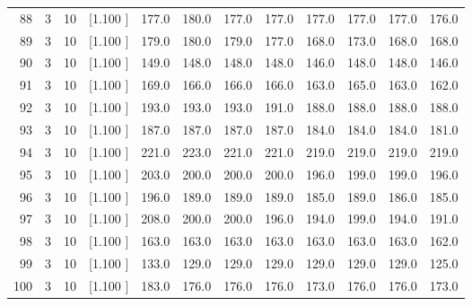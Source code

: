 \documentclass[12pt,a4paper]{article}
\begin{document}
\begin{center}
{\begin{tabular}{r r r r r r r r r r r r}
  88&  3& 10&[1.100     ]&   177.0&   180.0&   177.0&   177.0&   177.0&   177.0&   177.0&   176.0\\[-0.02in]
  89&  3& 10&[1.100     ]&   179.0&   180.0&   179.0&   177.0&   168.0&   173.0&   168.0&   168.0\\[-0.02in]
  90&  3& 10&[1.100     ]&   149.0&   148.0&   148.0&   148.0&   146.0&   148.0&   148.0&   146.0\\[-0.02in]
  91&  3& 10&[1.100     ]&   169.0&   166.0&   166.0&   166.0&   163.0&   165.0&   163.0&   162.0\\[-0.02in]
  92&  3& 10&[1.100     ]&   193.0&   193.0&   193.0&   191.0&   188.0&   188.0&   188.0&   188.0\\[-0.02in]
  93&  3& 10&[1.100     ]&   187.0&   187.0&   187.0&   187.0&   184.0&   184.0&   184.0&   181.0\\[-0.02in]
  94&  3& 10&[1.100     ]&   221.0&   223.0&   221.0&   221.0&   219.0&   219.0&   219.0&   219.0\\[-0.02in]
  95&  3& 10&[1.100     ]&   203.0&   200.0&   200.0&   200.0&   196.0&   199.0&   199.0&   196.0\\[-0.02in]
  96&  3& 10&[1.100     ]&   196.0&   189.0&   189.0&   189.0&   185.0&   189.0&   186.0&   185.0\\[-0.02in]
  97&  3& 10&[1.100     ]&   208.0&   200.0&   200.0&   196.0&   194.0&   199.0&   194.0&   191.0\\[-0.02in]
  98&  3& 10&[1.100     ]&   163.0&   163.0&   163.0&   163.0&   163.0&   163.0&   163.0&   162.0\\[-0.02in]
  99&  3& 10&[1.100     ]&   133.0&   129.0&   129.0&   129.0&   129.0&   129.0&   129.0&   125.0\\[-0.02in]
 100&  3& 10&[1.100     ]&   183.0&   176.0&   176.0&   176.0&   173.0&   176.0&   176.0&   173.0\\[-0.02in]

\hline
\end{tabular}}
\end{center}
\end{document}
